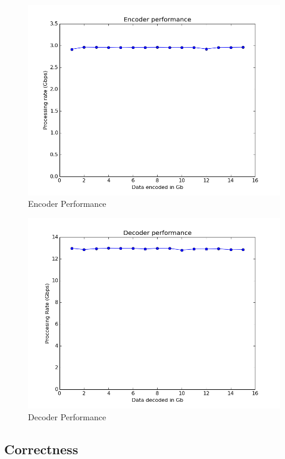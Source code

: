 \documentclass[conference]{IEEEtran}
\begin{document}
\begin{figure}[h!]
  \centering
  \includegraphics[scale=0.50]{encoder_figure}
  \caption{Encoder Performance}
  \label{fig:encoder_performance}
\end{figure}

\begin{figure}[h!]
  \centering
  \includegraphics[scale=0.50]{decoder_figure}
  \caption{Decoder Performance}
  \label{fig:decoder_performance}
\end{figure}

\subsection{Correctness}
\end{document}
